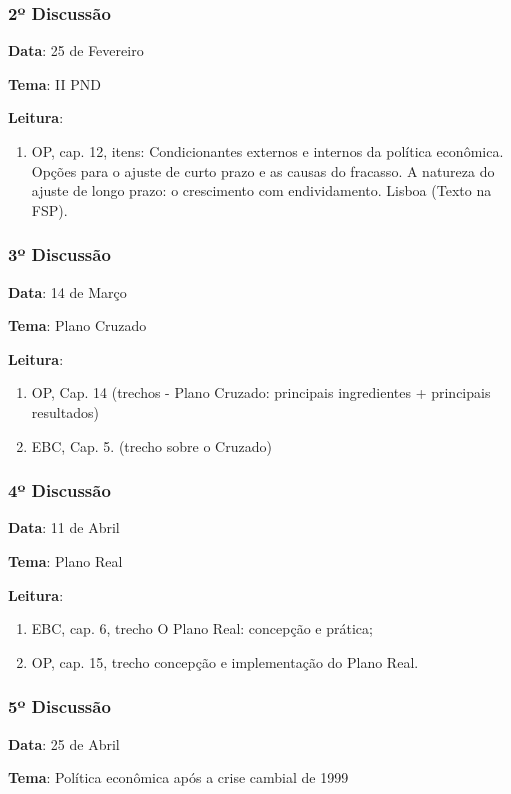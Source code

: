 \documentclass[a4paper,12pt]{article}[abntex2]
\begin{document}
\subsubsection*{\textbf{2º Discussão}}
\textbf{Data}: 25 de Fevereiro

\textbf{Tema}: II PND

\textbf{Leitura}:\begin{enumerate}
    \item OP, cap. 12, itens: Condicionantes externos e internos da política econômica. Opções para o ajuste de curto prazo e as causas do fracasso. A natureza do ajuste de longo prazo:  o crescimento com endividamento. Lisboa (Texto na FSP).
\end{enumerate}

\subsubsection*{\textbf{3º Discussão}}
\textbf{Data}: 14 de Março

\textbf{Tema}: Plano Cruzado

\textbf{Leitura}:\begin{enumerate}
    \item  OP, Cap. 14 (trechos - Plano Cruzado: principais ingredientes + principais resultados)
    \item EBC, Cap. 5. (trecho sobre o Cruzado)
\end{enumerate}

\subsubsection*{\textbf{4º Discussão}}
\textbf{Data}: 11 de Abril

\textbf{Tema}: Plano Real

\textbf{Leitura}:\begin{enumerate}
    \item EBC, cap. 6, trecho O Plano Real: concepção e prática; 
    \item  OP, cap. 15, trecho concepção e implementação do Plano Real.
\end{enumerate}

\subsubsection*{\textbf{5º Discussão}}
\textbf{Data}: 25 de Abril

\textbf{Tema}: Política econômica após a crise cambial de 1999
\end{document}

